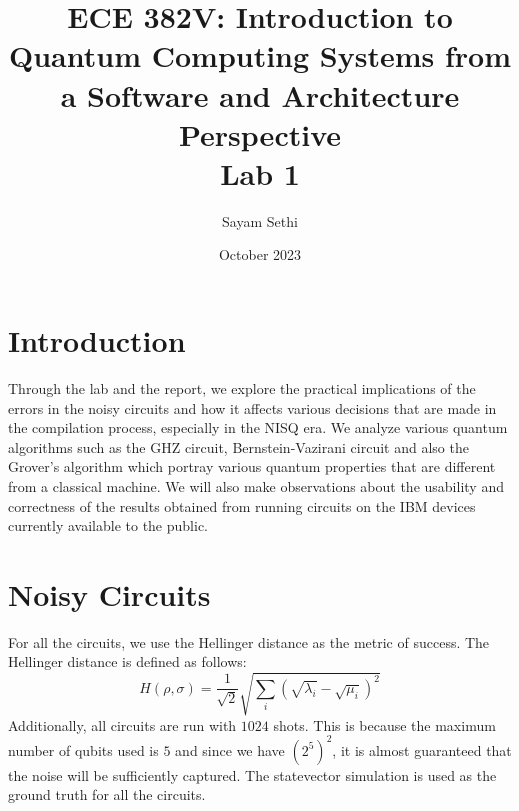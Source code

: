 \documentclass[11pt]{article}
\title{ECE 382V: Introduction to Quantum Computing Systems from a Software and Architecture Perspective\\Lab 1}
\author{Sayam Sethi}
\date{October 2023}
\begin{document}
\maketitle

\tableofcontents

\section{Introduction}
Through the lab and the report, we explore the practical implications of the errors in the noisy circuits and how it affects various decisions that are made in the compilation process, especially in the NISQ era. We analyze various quantum algorithms such as the GHZ circuit, Bernstein-Vazirani circuit and also the Grover's algorithm which portray various quantum properties that are different from a classical machine. We will also make observations about the usability and correctness of the results obtained from running circuits on the IBM devices currently available to the public.

\section{Noisy Circuits}
For all the circuits, we use the Hellinger distance as the metric of success. The Hellinger distance is defined as follows:
\begin{equation}
    H(\rho, \sigma) = \frac{1}{\sqrt{2}} \sqrt{\sum_{i} (\sqrt{\lambda_i} - \sqrt{\mu_i})^2}
\end{equation}
Additionally, all circuits are run with $1024$ shots. This is because the maximum number of qubits used is $5$ and since we have $(2^5)^2$, it is almost guaranteed that the noise will be sufficiently captured. The statevector simulation is used as the ground truth for all the circuits.
\end{document}
